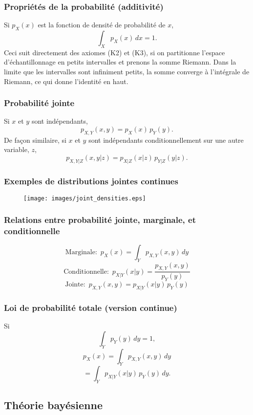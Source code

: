 \documentclass{beamer}
\begin{document}
\begin{frame}
    \frametitle{Propriétés de la probabilité (additivité)}
    Si $p_X(x)$ est la fonction de densité de probabilité de $x$,
    \[\int_X p_X(x) \, dx = 1.\]
    \vfill
    \pause
    Ceci suit directement des axiomes (K2) et (K3), si on partitionne l'espace d'échantillonnage
    en petits intervalles et prenons la somme Riemann. Dans la limite que les intervalles sont infiniment
    petits, la somme converge à l'intégrale de Riemann, ce qui donne l'identité en haut.
\end{frame}


\begin{frame}
    \frametitle{Probabilité jointe}
    Si $x$ et $y$ sont indépendants,
    \[p_{X,Y}(x,y) = p_X(x) \, p_Y(y).\]
    \pause
    De façon similaire, si $x$ et $y$ sont indépendants
    conditionnellement sur une autre variable, $z$,
    \[p_{X,Y|Z}(x,y|z) = p_{X|Z}(x|z) \, p_{Y|Z}(y|z).\]
\end{frame}


\begin{frame}
    \frametitle{Exemples de distributions jointes continues}
    \begin{figure}
      \centering
      \texttt{[image: images/joint\_densities.eps]}
    \end{figure}
\end{frame}


\begin{frame}
    \frametitle{Relations entre probabilité jointe, marginale, et conditionnelle}
    \[\textrm{Marginale:} \, \, \, p_X(x) = \int_Y p_{X,Y}(x,y) \, dy\]
    \pause
    \[\textrm{Conditionnelle:} \, \, \, p_{X|Y}(x|y) = \frac{p_{X,Y}(x,y)}{p_Y(y)}\]
    \pause
    \[\textrm{Jointe:} \, \, \, p_{X,Y}(x,y) = p_{X|Y}(x|y) \, p_Y(y)\]
\end{frame}


\begin{frame}
    \frametitle{Loi de probabilité totale (version continue)}
    Si
    \[\int_Y p_Y(y) \, dy = 1,\]
    \pause
    \[p_X(x) = \int_{Y} p_{X,Y}(x, y) \, dy\]
    \pause
    \[= \int_{Y} p_{X|Y}(x | y) \, p_Y(y) \, dy.\]
\end{frame}



\subsection{Théorie bayésienne}
\end{document}
